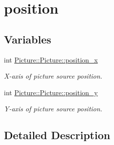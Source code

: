 \hypertarget{group___picture}{}\section{position}
\label{group___picture}
\subsection*{Variables}
\begin{DoxyCompactItemize}
\item 
\mbox{\label{group___picture_gabc618c40aa01ec5878903a3170e1867a}} 
int \hyperlink{group___picture_gabc618c40aa01ec5878903a3170e1867a}{Picture\+::\+Picture\+::position\+\_\+x}
\begin{DoxyCompactList}\small\item\em X-\/axis of picture source position. \end{DoxyCompactList}\item 
\mbox{\label{group___picture_gaad6be8d081af96530b6de3094b979af9}} 
int \hyperlink{group___picture_gaad6be8d081af96530b6de3094b979af9}{Picture\+::\+Picture\+::position\+\_\+y}
\begin{DoxyCompactList}\small\item\em Y-\/axis of picture source position. \end{DoxyCompactList}\end{DoxyCompactItemize}


\subsection{Detailed Description}

